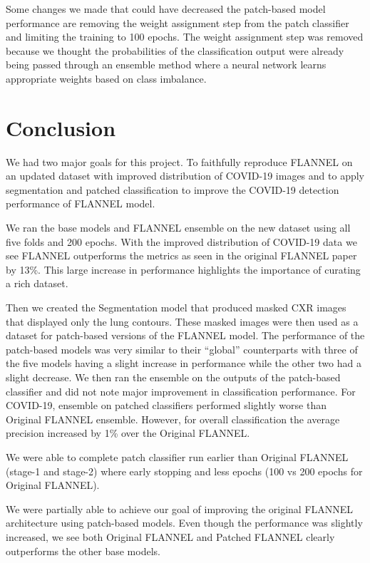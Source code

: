 \documentclass{sigkddExp}
\begin{document}
Some changes we made that could have decreased the patch-based model performance
are removing the weight assignment step from the patch classifier and limiting
the training to 100 epochs. The weight assignment step was removed because we
thought the probabilities of the classification output were already being passed
through an ensemble method where a neural network learns appropriate weights
based on class imbalance.


\section{Conclusion}
We had two major goals for this project. To faithfully reproduce FLANNEL on an
updated dataset with improved distribution of COVID-19 images and to apply
segmentation and patched classification to improve the COVID-19 detection
performance of FLANNEL model.

We ran the base models and FLANNEL ensemble on the new dataset using all five
folds and 200 epochs. With the improved distribution of COVID-19 data we see
FLANNEL outperforms the metrics as seen in the original FLANNEL paper by 13\%.
This large increase in performance highlights the importance of curating a rich
dataset.

Then we created the Segmentation model that produced masked CXR images that
displayed only the lung contours. These masked images were then used as a
dataset for patch-based versions of the FLANNEL model. The performance of the
patch-based models was very similar to their “global” counterparts with three of
the five models having a slight increase in performance while the other two had
a slight decrease. We then ran the ensemble on the outputs of the patch-based
classifier and did not note major improvement in classification performance. For
COVID-19, ensemble on patched classifiers performed slightly worse than Original
FLANNEL ensemble. However, for overall classification the average precision
increased by 1\% over the Original FLANNEL.

We were able to complete patch classifier run earlier than Original FLANNEL
(stage-1 and stage-2) where early stopping and less epochs (100 vs 200 epochs
for Original FLANNEL).

We were partially able to achieve our goal of improving the original FLANNEL
architecture using patch-based models. Even though the performance was slightly
increased, we see both Original FLANNEL and Patched FLANNEL clearly outperforms
the other base models.
\end{document}
